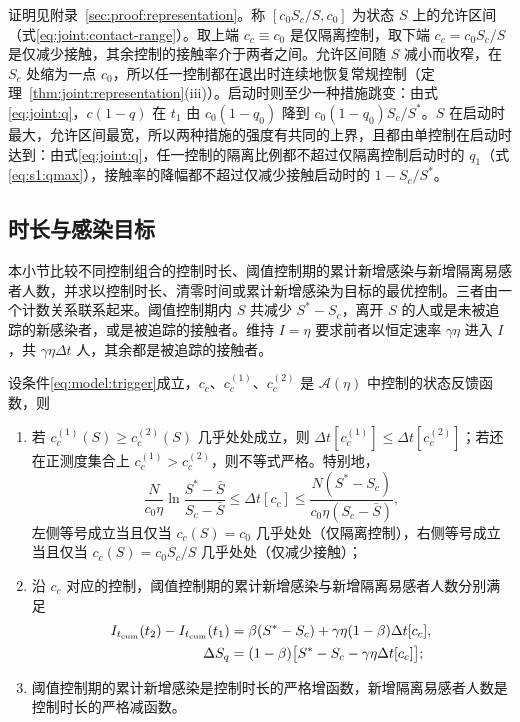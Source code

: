 证明见附录~\ref{sec:proof:representation}。称 $[c_0S_c/S,c_0]$ 为状态 $S$ 上的允许区间（式\eqref{eq:joint:contact-range}）。取上端 $c_c\equiv c_0$ 是仅隔离控制，取下端 $c_c=c_0S_c/S$ 是仅减少接触，其余控制的接触率介于两者之间。允许区间随 $S$ 减小而收窄，在 $S_c$ 处缩为一点 $c_0$，所以任一控制都在退出时连续地恢复常规控制（定理~\ref{thm:joint:representation}(iii)）。启动时则至少一种措施跳变：由式\eqref{eq:joint:q}，$c(1-q)$ 在 $t_1$ 由 $c_0(1-q_0)$ 降到 $c_0(1-q_0)S_c/S^*$。$S$ 在启动时最大，允许区间最宽，所以两种措施的强度有共同的上界，且都由单控制在启动时达到：由式\eqref{eq:joint:q}，任一控制的隔离比例都不超过仅隔离控制启动时的 $q_1$（式\eqref{eq:s1:qmax}），接触率的降幅都不超过仅减少接触启动时的 $1-S_c/S^*$。

\subsection{时长与感染目标}
\label{sec:joint:objectives}
本小节比较不同控制组合的控制时长、阈值控制期的累计新增感染与新增隔离易感者人数，并求以控制时长、清零时间或累计新增感染为目标的最优控制。三者由一个计数关系联系起来。阈值控制期内 $S$ 共减少 $S^*-S_c$，离开 $S$ 的人或是未被追踪的新感染者，或是被追踪的接触者。维持 $I=\eta$ 要求前者以恒定速率 $\gamma\eta$ 进入 $I$，共 $\gamma\eta\Delta t$ 人，其余都是被追踪的接触者。
\begin{theorem}
\label{thm:joint:comparison}
设条件\eqref{eq:model:trigger}成立，$c_c$、$c_c^{(1)}$、$c_c^{(2)}$ 是 $\mathcal A(\eta)$ 中控制的状态反馈函数，则
\begin{enumerate}
\renewcommand{\labelenumi}{(\roman{enumi})}
\item 若 $c_c^{(1)}(S)\ge c_c^{(2)}(S)$ 几乎处处成立，则 $\Delta t[c_c^{(1)}]\le\Delta t[c_c^{(2)}]$；若还在正测度集合上 $c_c^{(1)}>c_c^{(2)}$，则不等式严格。特别地，
\begin{equation}
\frac{N}{c_0\eta}\ln\frac{S^*-\bar S}{S_c-\bar S}
\le\Delta t[c_c]\le
\frac{N(S^*-S_c)}{c_0\eta(S_c-\bar S)},
\label{eq:joint:duration-bounds}
\end{equation}
左侧等号成立当且仅当 $c_c(S)=c_0$ 几乎处处（仅隔离控制），右侧等号成立当且仅当 $c_c(S)=c_0S_c/S$ 几乎处处（仅减少接触）；
\item 沿 $c_c$ 对应的控制，阈值控制期的累计新增感染与新增隔离易感者人数分别满足
\begin{align}
I_{t_{\mathrm{cum}}}(t_2)-I_{t_{\mathrm{cum}}}(t_1)
&=\beta(S^*-S_c)+\gamma\eta(1-\beta)\Delta t[c_c],
\label{eq:joint:cumulative}\\
\Delta S_q
&=(1-\beta)\bigl[S^*-S_c-\gamma\eta\Delta t[c_c]\bigr];
\label{eq:joint:quarantine}
\end{align}
\item 阈值控制期的累计新增感染是控制时长的严格增函数，新增隔离易感者人数是控制时长的严格减函数。
\end{enumerate}
\end{theorem}
